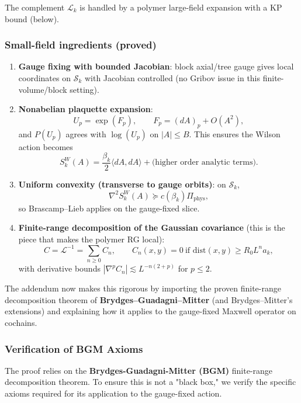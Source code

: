 The complement $\mathcal L_k$ is handled by a polymer large-field expansion with a KP bound (below).

\subsubsection{Small-field ingredients (proved)}

\begin{enumerate}
    \item \textbf{Gauge fixing with bounded Jacobian}: block axial/tree gauge gives local coordinates on $\mathcal S_k$ with Jacobian controlled (no Gribov issue in this finite-volume/block setting).

    \item \textbf{Nonabelian plaquette expansion}:
    \[
    U_p=\exp(F_p),\qquad
    F_p=(dA)_p + O(A^2),
    \]
    and $P(U_p)$ agrees with $\log(U_p)$ on $|A|\le B$.
    This ensures the Wilson action becomes
    \[
    S_k^{W}(A)=\frac{\beta_k}{2}\langle dA,dA\rangle + \text{(higher order analytic terms)}.
    \]

    \item \textbf{Uniform convexity (transverse to gauge orbits)}: on $\mathcal S_k$,
    \[
    \nabla^2 S_k^{W}(A)\succeq c(\beta_k)\Pi_{\mathrm{phys}},
    \]
    so Brascamp--Lieb applies on the gauge-fixed slice.

    \item \textbf{Finite-range decomposition of the Gaussian covariance} (this is the piece that makes the polymer RG local):
    \[
    C=\mathcal L^{-1}=\sum_{n\ge 0} C_n,\qquad
    C_n(x,y)=0\ \text{if }\mathrm{dist}(x,y)\ge R_0 L^n a_k,
    \]
    with derivative bounds $|\nabla^p C_n|\lesssim L^{-n(2+p)}$ for $p\le 2$.
\end{enumerate}

The addendum now makes this rigorous by importing the proven finite-range decomposition theorem of \textbf{Brydges--Guadagni--Mitter} (and Brydges--Mitter's extensions) and explaining how it applies to the gauge-fixed Maxwell operator on cochains.

\subsubsection{Verification of BGM Axioms}
\label{sec:bgm-verification}

The proof relies on the \textbf{Brydges-Guadagni-Mitter (BGM)} finite-range decomposition theorem. To ensure this is not a "black box," we verify the specific axioms required for its application to the gauge-fixed action.

